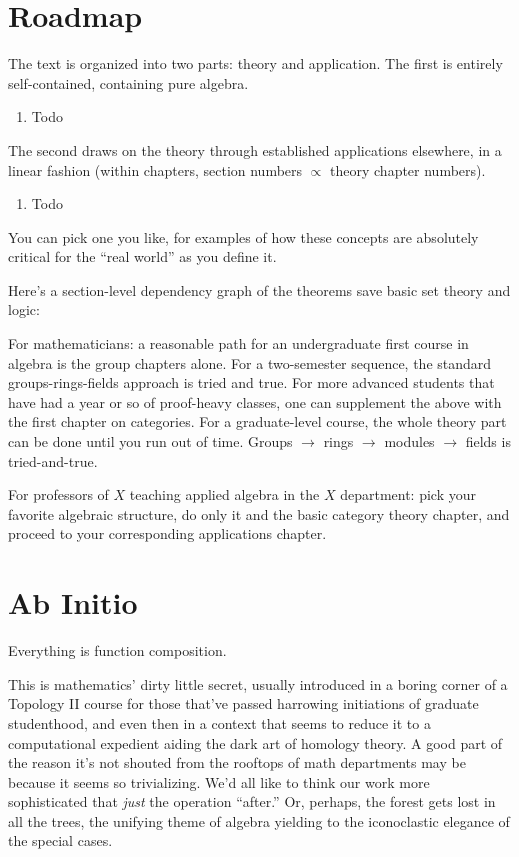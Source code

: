 \documentclass{book}
\begin{document}
\chapter*{Roadmap}
The text is organized into two parts: theory and application.
The first is entirely self-contained, containing pure algebra.
\begin{enumerate}
\item Todo
\end{enumerate}
The second draws on the theory through established applications elsewhere, in a linear fashion
(within chapters, section numbers $\propto$ theory chapter numbers).
\begin{enumerate}
\item Todo
\end{enumerate}
You can pick one you like, for examples of how these concepts are absolutely critical for the ``real world'' as you define it.

Here's a section-level dependency graph of the theorems save basic set theory and logic:

For mathematicians: a reasonable path for an undergraduate first course in algebra is the group chapters alone.
For a two-semester sequence, the standard groups-rings-fields approach is tried and true.
For more advanced students that have had a year or so of proof-heavy classes, one can supplement the above with the first chapter on categories.
For a graduate-level course, the whole theory part can be done until you run out of time.
Groups $\to$ rings $\to$ modules $\to$ fields is tried-and-true.

For professors of $X$ teaching applied algebra in the $X$ department: pick your favorite algebraic structure, do only it and the basic category theory chapter, and proceed to your corresponding applications chapter.

\tableofcontents

\chapter{Ab Initio}

Everything is function composition.

This is mathematics' dirty little secret, usually introduced in a boring corner of a Topology II course
for those that've passed harrowing initiations of graduate studenthood, and even then in a context that seems to reduce it
to a computational expedient aiding the dark art of homology theory.
A good part of the reason it's not shouted from the rooftops of math departments may be because it seems so trivializing.
We'd all like to think our work more sophisticated that \textit{just} the operation ``after.''
Or, perhaps, the forest gets lost in all the trees, the unifying theme of algebra yielding to the iconoclastic elegance of the special cases.
\end{document}
